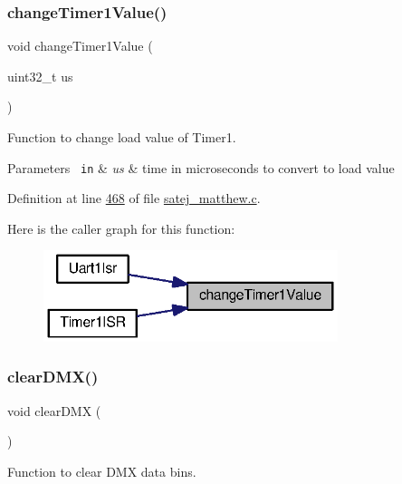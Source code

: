 \subsubsection{\texorpdfstring{changeTimer1Value()}{changeTimer1Value()}}
{\footnotesize\ttfamily void change\+Timer1\+Value (\begin{DoxyParamCaption}\item[{uint32\+\_\+t}]{us }\end{DoxyParamCaption})}



Function to change load value of Timer1. 


\begin{DoxyParams}[1]{Parameters}
\mbox{\texttt{ in}}  & {\em us} & time in microseconds to convert to load value \\
\hline
\end{DoxyParams}


Definition at line \mbox{\hyperlink{satej__matthew_8c_source_l00468}{468}} of file \mbox{\hyperlink{satej__matthew_8c_source}{satej\+\_\+matthew.\+c}}.

Here is the caller graph for this function\+:
\nopagebreak
\begin{figure}[H]
\begin{center}
\leavevmode
\includegraphics[width=244pt]{satej__matthew_8c_ae0e2b59e29ecdbadeb6bfa1a9efa5a85_icgraph}
\end{center}
\end{figure}
\mbox{\label{satej__matthew_8c_a90f05ed3280bc7f2e971ed7216028960}} 
\subsubsection{\texorpdfstring{clearDMX()}{clearDMX()}}
{\footnotesize\ttfamily void clear\+D\+MX (\begin{DoxyParamCaption}{ }\end{DoxyParamCaption})}



Function to clear D\+MX data bins. 



